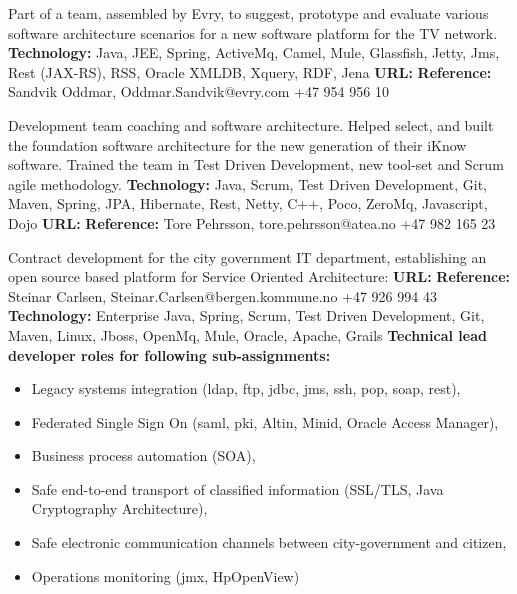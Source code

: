 \documentclass[11pt,a4paper,sans]{moderncv} %
\begin{document}
{
Part of a team, assembled by Evry, to suggest, prototype and evaluate various software architecture scenarios for a new software platform for	the TV network.
\newline{}\textbf{Technology:} Java, JEE, Spring, ActiveMq, Camel, Mule, Glassfish, Jetty, Jms, Rest (JAX-RS), RSS, Oracle XMLDB, Xquery, RDF, Jena
\newline{}\textbf{URL:} 
\newline{}\textbf{Reference:} Sandvik Oddmar, Oddmar.Sandvik@evry.com +47 954 956 10
}

{
Development team coaching and software architecture.
Helped select, and built the foundation  software architecture for the new generation of their iKnow software.
Trained the team in Test Driven Development, new tool-set and  Scrum agile methodology.
\newline{}\textbf{Technology:} Java,  Scrum,  Test Driven Development,  Git,  Maven,  Spring, JPA, Hibernate, Rest, Netty, C++, Poco, ZeroMq, Javascript, Dojo
\newline{}\textbf{URL:} 
\newline{}\textbf{Reference:} Tore Pehrsson,  tore.pehrsson@atea.no +47 982 165 23
}

\pagebreak

{
Contract development for the city government IT department, establishing an open source based platform for Service Oriented Architecture:
\newline{}\textbf{URL:} 
\newline{}\textbf{Reference:} Steinar Carlsen,  Steinar.Carlsen@bergen.kommune.no +47 926 994 43
\newline{}\textbf{Technology:} Enterprise Java, Spring,  Scrum, Test Driven Development, Git, Maven,  Linux,  Jboss, OpenMq,  Mule,  Oracle, Apache,  Grails
\newline{}\textbf{Technical lead developer roles for following  sub-assignments:}
\begin{itemize}
\item Legacy systems integration (ldap, ftp, jdbc, jms, ssh, pop, soap, rest),
\item Federated Single Sign On (saml, pki, Altin, Minid, Oracle Access Manager),
\item Business process automation (SOA),
\item Safe end-to-end transport of classified information (SSL/TLS, Java Cryptography Architecture),
\item Safe electronic communication channels between city-government and citizen,
\item Operations monitoring (jmx, HpOpenView)
\end{itemize}
}
\end{document}
